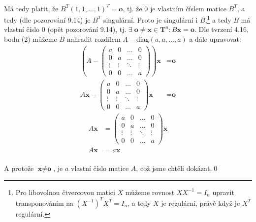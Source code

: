 \documentclass[11pt]{article}
\begin{document}
\paragraph*{} Má tedy platit, že $B^T(1, 1,\dots,1)^T=\textbf{o}$, tj. že 0 je vlastním číslem matice $B^T$, a tedy (dle pozorování 9.14) je $B^T$ singulární. Proto je singulární i $B$,\footnote{Pro libovolnou čtvercovou matici $X$ můžeme rovnost $XX^{-1}=I_n$ upravit transponováním na $(X^{-1})^TX^T=I_n$, a tedy $X$ je regulární, právě když je $X^T$ regulární.} a tedy $B$ má vlastní číslo 0 (opět pozorování 9.14), tj. $\exists\;\textbf{o}\neq\textbf{x}\in\textbf{T}^n:B\textbf{x}=\textbf{o}$. Dle tvrzení 4.16, bodu (2) můžeme $B$ nahradit rozdílem $A-$diag$(a, a, \dots, a)$ a dále upravovat:
\begin{align*}
\left(A-\begin{pmatrix}
  a      & 0      & \dots  & 0      \\
  0      & a      & \dots  & 0      \\
  \vdots & \vdots & \ddots & \vdots \\
  0      & 0      & \dots  & a
\end{pmatrix}\right)\textbf{x}&=\textbf{o}\\
A\textbf{x}-\begin{pmatrix}
  a      & 0      & \dots  & 0      \\
  0      & a      & \dots  & 0      \\
  \vdots & \vdots & \ddots & \vdots \\
  0      & 0      & \dots  & a
\end{pmatrix}\textbf{x}&=\textbf{o}\end{align*}
\begin{align*}
A\textbf{x}&=\begin{pmatrix}
  a      & 0      & \dots  & 0      \\
  0      & a      & \dots  & 0      \\
  \vdots & \vdots & \ddots & \vdots \\
  0      & 0      & \dots  & a
\end{pmatrix}\textbf{x}\\
A\textbf{x}&=a\textbf{x}
\end{align*}
\paragraph*{} A protože $\textbf{x}\neq\textbf{o}$, je $a$ vlastní číslo matice $A$, což jsme chtěli dokázat.\qed
\end{document}
